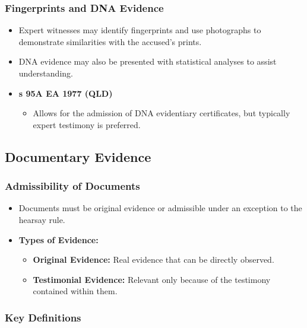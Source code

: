 \subsubsection{Fingerprints and DNA
Evidence}\label{fingerprints-and-dna-evidence}

\begin{itemize}
\tightlist
\item
  Expert witnesses may identify fingerprints and use photographs to
  demonstrate similarities with the accused's prints.
\item
  DNA evidence may also be presented with statistical analyses to assist
  understanding.
\item
  \textbf{s 95A EA 1977 (QLD)}

  \begin{itemize}
  \tightlist
  \item
    Allows for the admission of DNA evidentiary certificates, but
    typically expert testimony is preferred.
  \end{itemize}
\end{itemize}

\subsection{ Documentary Evidence}\label{documentary-evidence}

\subsubsection{Admissibility of
Documents}\label{admissibility-of-documents}

\begin{itemize}
\tightlist
\item
  Documents must be original evidence or admissible under an exception
  to the hearsay rule.
\item
  \textbf{Types of Evidence:}

  \begin{itemize}
  \tightlist
  \item
    \textbf{Original Evidence:} Real evidence that can be directly
    observed.
  \item
    \textbf{Testimonial Evidence:} Relevant only because of the
    testimony contained within them.
  \end{itemize}
\end{itemize}

\subsubsection{Key Definitions}\label{key-definitions}

